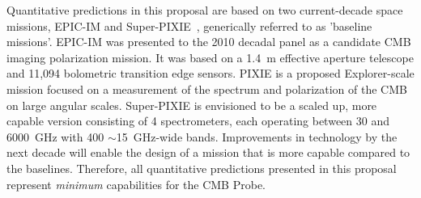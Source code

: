 Quantitative predictions in this proposal are based on two current-decade space missions, 
EPIC-IM and Super-PIXIE~\cite{bock2009, Kogut2011PIXIE}, generically referred to 
as 'baseline missions'. EPIC-IM was presented 
to the 2010 decadal panel as a candidate \ac{CMB} imaging polarization mission. 
It was based on a 1.4~m effective aperture telescope and 11,094 bolometric transition edge sensors. 
PIXIE is a proposed Explorer-scale mission focused on a measurement of the spectrum 
and polarization of the CMB on large angular scales. Super-PIXIE is envisioned to be a scaled up, 
more capable version consisting of 4 spectrometers, each operating between 
30 and 6000~GHz with 400 $\sim$15~GHz-wide bands. Improvements in technology by the next decade will enable 
the design of a mission that is more capable compared to the baselines. Therefore, all 
quantitative predictions presented in this proposal represent {\it minimum} capabilities for the CMB Probe. 

